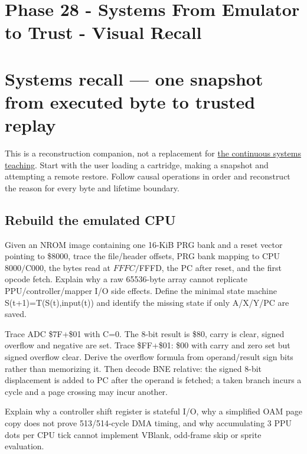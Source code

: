\hypertarget{appendix-11f73b337e37}{}
\section*{Phase 28 - Systems From Emulator to Trust - Visual Recall}
\section{Systems recall --- one snapshot from executed byte to trusted replay}\label{appendix-11f73b337e37-systems-recall-one-snapshot-from-executed-byte-to-trusted-replay}

This is a reconstruction companion, not a replacement for \href{Continuous\%20Notes/Computing\%20Foundations\%20-\%20From\%20Bits\%20to\%20C++\%20and\%20Systems\%20APIs}{the continuous systems teaching}. Start with the user loading a cartridge, making a snapshot and attempting a remote restore. Follow causal operations in order and reconstruct the reason for every byte and lifetime boundary.

\subsection{Rebuild the emulated CPU}\label{appendix-11f73b337e37-rebuild-the-emulated-cpu}

Given an NROM image containing one 16-KiB PRG bank and a reset vector pointing to \$8000, trace the file/header offsets, PRG bank mapping to CPU \(8000/\)C000, the bytes read at \(FFFC/\)FFFD, the PC after reset, and the first opcode fetch. Explain why a raw 65536-byte array cannot replicate PPU/controller/mapper I/O side effects. Define the minimal state machine S(t+1)=T(S(t),input(t)) and identify the missing state if only A/X/Y/PC are saved.

Trace ADC \$7F+\$01 with C=0. The 8-bit result is \$80, carry is clear, signed overflow and negative are set. Trace \$FF+\$01: \$00 with carry and zero set but signed overflow clear. Derive the overflow formula from operand/result sign bits rather than memorizing it. Then decode BNE relative: the signed 8-bit displacement is added to PC after the operand is fetched; a taken branch incurs a cycle and a page crossing may incur another.

Explain why a controller shift register is stateful I/O, why a simplified OAM page copy does not prove 513/514-cycle DMA timing, and why accumulating 3 PPU dots per CPU tick cannot implement VBlank, odd-frame skip or sprite evaluation.


